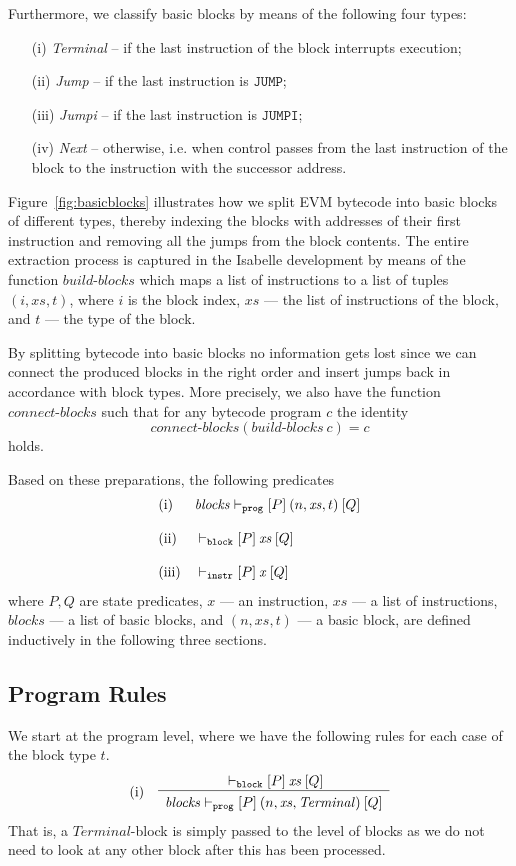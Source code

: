 \documentclass[sigplan,10pt,review]{acmart}\settopmatter{printfolios=true,printccs=false,printacmref=false}
\newcommand{\ttrip}[5]{\mathit{#1} \vdash_{\mathrm{#2}}[#3]\:#4\:[#5]}
\newcommand{\instr}[1]{\mathtt{#1}}
\newcommand{\RuleC}[2]{\begin{array}{c}#1\\\hline\noalign{\smallskip}#2\end{array}}
\newcommand{\bblocks}{\mathit{build\mbox{-}blocks}}
\newcommand{\cblocks}{\mathit{connect\mbox{-}blocks}}
\begin{document}
Furthermore, we classify basic blocks by means of the following four types:
\begin{itemize}
\item[(i)] \textit{Terminal} -- if the last instruction of the block interrupts execution;
\item[(ii)] \textit{Jump} -- if the last instruction is $\instr{JUMP}$;
\item[(iii)] \textit{Jumpi} -- if the last instruction is $\instr{JUMPI}$;
\item[(iv)] \textit{Next} -- otherwise, i.e. when control passes from the last instruction of the block
                             to the instruction with the successor address.                         
\end{itemize} 
Figure~\ref{fig:basicblocks} illustrates how we split EVM bytecode into basic blocks of different
types, thereby indexing the blocks with addresses of their first instruction
and removing all the jumps from the block contents. %
The entire extraction process is captured in the Isabelle development
by means of the function $\bblocks$ which maps a list of instructions to a list of tuples $(i, \mathit{xs}, t)$,
where $i$ is the block index, $\mathit{xs}$ --- the list of instructions of the block, and $t$ --- the type of
the block. 

By splitting bytecode into basic blocks no information gets lost since we can connect the produced blocks
in the right order and insert jumps back in accordance with block types. More precisely, we also have the function
$\cblocks$ such that for any bytecode program $c$ the identity 
\[
\cblocks(\bblocks\:c) = c
\]
holds.  

Based on these preparations, the following predicates 
\[
\begin{array}{l l}
\mbox{(i)} & \ttrip{\mathit{blocks}}{\mathtt{prog}}{P}{(n, \mathit{xs}, t)}{Q} \\
\\
\mbox{(ii)} & \ttrip{}{\mathtt{block}}{P}{\mathit{xs}}{Q} \\
\\
\mbox{(iii)} & \ttrip{}{\mathtt{instr}}{P}{\mathit{x}}{Q} 
\end{array}
\]
where $P, Q$ are state predicates, $x$ --- an instruction, $\mathit{xs}$ --- a list of instructions,
$\mathit{blocks}$ --- a list of basic blocks, and
$(n, \mathit{xs}, t)$ --- a basic block, are defined inductively in the following three sections.
%
\subsection{Program Rules}
\label{sec:prog-rules}
%
We start at the program level, where we have the following rules for
each case of the block type $t$.
\[
\begin{array}{l l}
\mbox{(i)} & \RuleC{\ttrip{}{\mathtt{block}}{P}{\mathit{xs}}{Q}}
     {\ttrip{\mathit{blocks}}{\mathtt{prog}}{P}{(n, \mathit{xs}, \mathit{Terminal})}{Q}}
\end{array}
\]
That is, a $\mathit{Terminal}$-block is simply passed to the level of
blocks as we do not need to look at any other block after this has been processed.  
\end{document}
